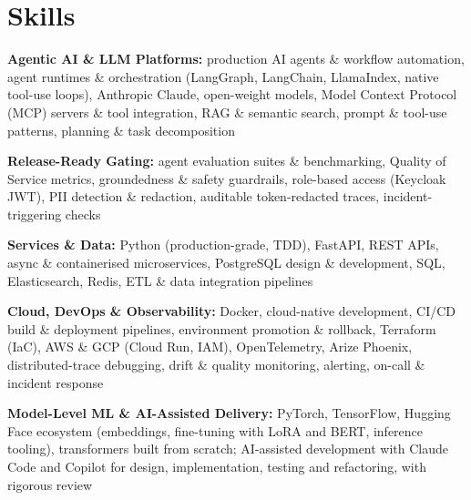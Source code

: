 \documentclass[10pt,a4paper]{article}
\begin{document}
\section{Skills}
\begin{tight}
  \item[\textcolor{accent}{\small$\bullet$}] \textbf{Agentic AI \& LLM Platforms:} production AI agents \& workflow automation, agent runtimes \& orchestration (LangGraph, LangChain, LlamaIndex, native tool-use loops), Anthropic Claude, open-weight models, Model Context Protocol (MCP) servers \& tool integration, RAG \& semantic search, prompt \& tool-use patterns, planning \& task decomposition
  \item[\textcolor{accent}{\small$\bullet$}] \textbf{Release-Ready Gating:} agent evaluation suites \& benchmarking, Quality of Service metrics, groundedness \& safety guardrails, role-based access (Keycloak JWT), PII detection \& redaction, auditable token-redacted traces, incident-triggering checks
  \item[\textcolor{accent}{\small$\bullet$}] \textbf{Services \& Data:} Python (production-grade, TDD), FastAPI, REST APIs, async \& containerised microservices, PostgreSQL design \& development, SQL, Elasticsearch, Redis, ETL \& data integration pipelines
  \item[\textcolor{accent}{\small$\bullet$}] \textbf{Cloud, DevOps \& Observability:} Docker, cloud-native development, CI/CD build \& deployment pipelines, environment promotion \& rollback, Terraform (IaC), AWS \& GCP (Cloud Run, IAM), OpenTelemetry, Arize Phoenix, distributed-trace debugging, drift \& quality monitoring, alerting, on-call \& incident response
  \item[\textcolor{accent}{\small$\bullet$}] \textbf{Model-Level ML \& AI-Assisted Delivery:} PyTorch, TensorFlow, Hugging Face ecosystem (embeddings, fine-tuning with LoRA and BERT, inference tooling), transformers built from scratch; AI-assisted development with Claude Code and Copilot for design, implementation, testing and refactoring, with rigorous review
\end{tight}

\end{document}
